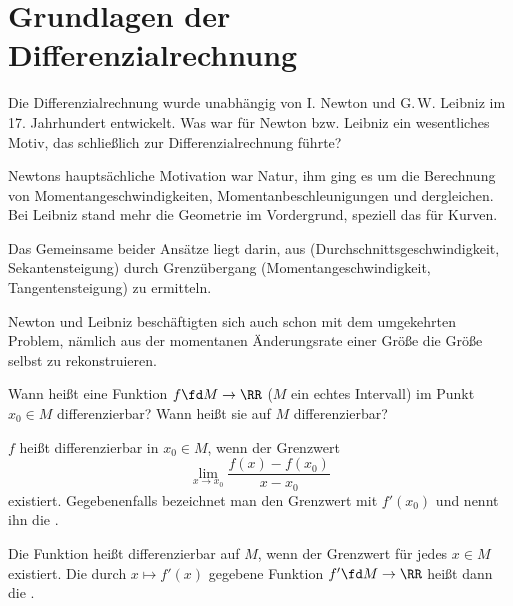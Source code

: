 \section{Grundlagen der Differenzialrechnung}

\begin{frage} 
Die Differenzialrechnung wurde unabhängig von I. Newton und 
G.\,W. Leibniz im 17. Jahrhundert entwickelt. Was war für Newton bzw. 
Leibniz ein wesentliches Motiv, das schließlich zur Differenzialrechnung 
führte?
\end{frage}

\begin{antwort}
Newtons hauptsächliche Motivation war  Natur,  
ihm ging es um die Berechnung von 
Momentangeschwindigkeiten, Momentanbeschleunigungen und dergleichen. 
Bei Leibniz stand mehr die Geometrie im Vordergrund, speziell
das  
für Kurven. 

Das Gemeinsame beider Ansätze liegt darin, aus 
(Durchschnittsgeschwindigkeit, Sekantensteigung) durch Grenzübergang 
(Momentangeschwindigkeit, Tangentensteigung) zu ermitteln. 

Newton und Leibniz beschäftigten sich auch schon mit dem umgekehrten 
Problem, nämlich aus der momentanen Änderungsrate einer Größe 
die Größe selbst zu rekonstruieren. 
\AntEnd       
\end{antwort}

\begin{frage}
\label{06_diffdef}
Wann heißt eine Funktion $f\fd M\to \RR$ 
($M$ ein echtes Intervall) im Punkt $x_0\in M$ 
differenzierbar? Wann heißt sie auf $M$ differenzierbar?
\end{frage}

\begin{antwort}
$f$ heißt differenzierbar in $x_0 \in M$, wenn der Grenzwert 
\begin{equation}
\lim_{x\to x_0} \frac{f(x)-f(x_0)}{x-x_0} 
\tag{D$_1$}
\end{equation}
existiert. Gegebenenfalls bezeichnet man den Grenzwert mit $f'(x_0)$ und 
nennt ihn die .

Die Funktion heißt differenzierbar auf $M$, wenn der Grenzwert 
für jedes $x\in M$ existiert. Die durch $x\mapsto f'(x)$ gegebene 
Funktion $f'\fd M\to \RR$ heißt dann die . 
\end{antwort}

